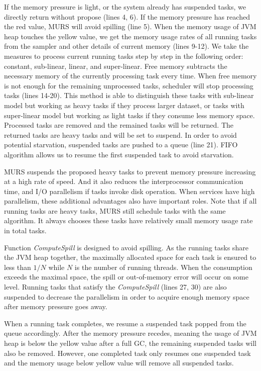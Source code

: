If the memory pressure is light, or the system already has suspended tasks, we directly return without propose (lines 4, 6). If the memory pressure has reached the red value, MURS will avoid spilling (line 5). When the memory usage of JVM heap touches the yellow value, we get the memory usage rates of all running tasks from the sampler and other details of current memory (lines 9-12). We take the measures to process current running tasks step by step in the following order: constant, sub-linear, linear, and super-linear. Free memory subtracts the necessary memory of the currently processing task every time. When free memory is not enough for the remaining unprocessed tasks, scheduler will stop processing tasks (lines 14-20). This method is able to distinguish these tasks with sub-linear model but working as heavy tasks if they process larger dataset, or tasks with super-linear model but working as light tasks if they consume less memory space. Processed tasks are removed and the remained tasks will be returned. The returned tasks are heavy tasks and will be set to suspend. In order to avoid potential starvation, suspended tasks are pushed to a queue (line 21). FIFO algorithm allows us to resume the first suspended task to avoid starvation. 

MURS suspends the proposed heavy tasks to prevent memory pressure increasing at a high rate of speed. And it also reduces the interprocessor communication time, and I/O parallelism if tasks invoke disk operation. When services have high parallelism, these additional advantages also have important roles. Note that if all running tasks are heavy tasks, MURS still schedule tasks with the same algorithm. It always chooses these tasks have relatively small memory usage rate in total tasks. 

Function \textit{ComputeSpill} is designed to avoid spilling. As the running tasks share the JVM heap together, the maximally allocated space for each task is ensured to less than $1/N$ while $N$ is the number of running threads. When the consumption exceeds the maximal space, the spill or out-of-memory error will occur on some level. Running tasks that satisfy the \textit{ComputeSpill} (lines 27, 30) are also suspended to decrease the parallelism in order to acquire enough memory space after memory pressure goes away.   

When a running task completes, we resume a suspended task popped from the queue accordingly. After the memory pressure recedes, meaning the usage of JVM heap is below the yellow value after a full GC, the remaining suspended tasks will also be removed. However, one completed task only resumes one suspended task and the memory usage below yellow value will remove all suspended tasks.

